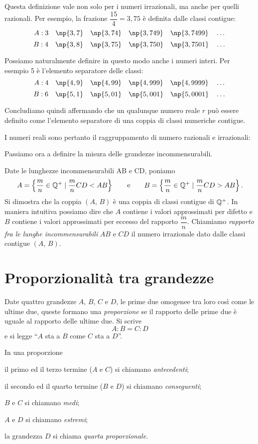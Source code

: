 Questa definizione vale non solo per i numeri irrazionali, ma anche per quelli razionali. Per esempio, la frazione $\dfrac{15}{4}=3,75$ è definita dalle classi contigue:
\[A: 3\quad \np{3,7}\quad \np{3,74}\quad \np{3,749}\quad \np{3,7499}\quad \ldots{}\]
\[B: 4\quad \np{3,8}\quad \np{3,75}\quad \np{3,750}\quad \np{3,7501}\quad \ldots{}\]

Possiamo naturalmente definire in questo modo anche i numeri interi. Per esempio 5 è l'elemento separatore delle classi:
\[A: 4\quad \np{4,9}\quad \np{4,99}\quad \np{4,999}\quad \np{4,9999}\quad \ldots{}\]
\[B: 6\quad \np{5,1}\quad \np{5,01}\quad \np{5,001}\quad \np{5,0001}\quad \ldots{}\]

Concludiamo quindi affermando che un qualunque numero reale $r$ può essere definito come l'elemento separatore di una coppia di classi numeriche contigue.

I numeri reali sono pertanto il raggruppamento di numero razionali e irrazionali:


Passiamo ora a definire la misura delle grandezze incommensurabili.

Date le lunghezze incommensurabili AB e CD, poniamo
\[A=\left\{\dfrac{m}{n}\in\mathbb{Q}^+\mid\dfrac{m}{n}CD<AB\right\}\qquad\text{e}\qquad B=\left\{\dfrac{m}{n}\in\mathbb{Q}^+\mid\dfrac{m}{n}CD>AB\right\}.\]
Si dimostra che la coppia $(A\text{, }B)$ è una coppia di classi contigue di $\mathbb{Q}^+$. In maniera intuitiva possiamo dire che $A$ contiene i valori approssimati per difetto e $B$ contiene i valori approssimati per eccesso del rapporto $\dfrac{m}{n}$.
Chiamiamo \emph{rapporto fra le lunghe incommensurabili} $AB$ e $CD$ il numero irrazionale dato dalle classi contigue $(A\text{, }B)$.


\section{Proporzionalità tra grandezze}

\begin{definizione}
Date quattro grandezze $A$, $B$, $C$ e $D$, le prime due omogenee tra loro così come le ultime due, queste formano una \emph{proporzione} se il rapporto delle prime due è uguale al rapporto delle ultime due. Si scrive
\[ A : B = C : D\]
e si legge ``$A$ sta a $B$ come $C$ sta a $D$''.
\end{definizione}

\begin{definizione}
In una proporzione
\begin{itemize*}
\item il primo ed il terzo termine ($A$ e $C$) si chiamano \emph{antecedenti};
\item il secondo ed il quarto termine ($B$ e $D$) si chiamano \emph{conseguenti};
\item $B$ e $C$ si chiamano \emph{medi};
\item $A$ e $D$ si chiamano \emph{estremi};
\item la grandezza $D$ si chiama \emph{quarta proporzionale}.
\end{itemize*}
\end{definizione}

